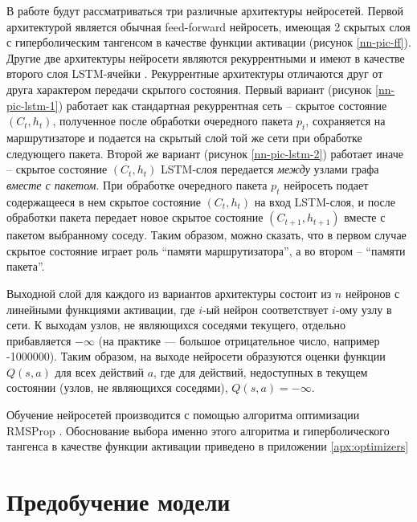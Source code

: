\documentclass[specification, annotation]{itmo-student-thesis}
\begin{document}
В работе будут рассматриваться три различные архитектуры нейросетей. Первой
архитектурой является обычная feed-forward нейросеть, имеющая 2 скрытых слоя с
гиперболическим тангенсом в качестве функции активации (рисунок
\ref{nn-pic-ff}). Другие две архитектуры нейросети
являются рекуррентными и имеют в качестве второго слоя
LSTM-ячейки \cite{hochreiter1997long}. Рекуррентные
архитектуры отличаются друг от друга характером передачи скрытого состояния.
Первый вариант (рисунок \ref{nn-pic-lstm-1}) работает как стандартная
рекуррентная сеть -- скрытое состояние $(C_t, h_t)$, полученное после обработки
очередного пакета $p_t$, сохраняется на маршрутизаторе и подается на скрытый
слой той же сети при обработке следующего пакета. Второй же вариант (рисунок
\ref{nn-pic-lstm-2}) работает иначе -- скрытое состояние $(C_t, h_t)$ LSTM-слоя
передается \textit{между} узлами графа \textit{вместе с пакетом}. При обработке
очередного пакета $p_t$ нейросеть подает содержащееся в нем скрытое состояние
$(C_t, h_t)$ на вход LSTM-слоя, и после обработки пакета передает новое скрытое
состояние $(C_{t+1}, h_{t+1})$ вместе с пакетом выбранному соседу. Таким
образом, можно сказать, что в первом случае скрытое состояние играет роль
``памяти маршрутизатора'', а во втором -- ``памяти пакета''.

Выходной слой для каждого из вариантов архитектуры состоит из $n$
нейронов с линейными функциями активации, где $i$-ый нейрон
соответствует $i$-ому узлу в сети. К выходам узлов, не являющихся соседями
текущего, отдельно прибавляется $-\infty$ (на практике --- большое отрицательное
число, например -1000000). Таким образом, на выходе нейросети образуются оценки
функции $Q(s, a)$ для всех действий $a$, где для действий, недоступных в текущем
состоянии (узлов, не являющихся соседями), $Q(s, a) = -\infty$.

Обучение нейросетей производится с помощью алгоритма оптимизации
RMSProp \cite{tieleman2012lecture}. Обоснование выбора именно этого алгоритма и
гиперболического тангенса в качестве функции активации приведено в приложении
\ref{apx:optimizers}

\section{Предобучение модели}
\end{document}
